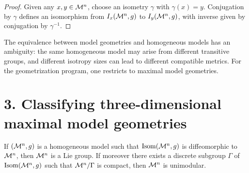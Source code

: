 \begin{proof}
Given any $x,y \in \mathcal{M}^n$, choose an isometry $\gamma$ with $\gamma(x)=y$. Conjugation by $\gamma$ defines an isomorphism from $I_x(\mathcal{M}^n,g)$ to $I_y(\mathcal{M}^n,g)$, with inverse given by conjugation by $\gamma^{-1}$.
\end{proof}

\begin{remark}
\label{ch01-rem-model-geometry-ambiguity}
The equivalence between model geometries and homogeneous models has an ambiguity: the same homogeneous model may arise from different transitive groups, and different isotropy sizes can lead to different compatible metrics. For the geometrization program, one restricts to maximal model geometries.
\end{remark}

\section*{3. Classifying three-dimensional maximal model geometries}

\begin{lemma}
\label{ch01-lem-unimodular-lie-group}
If $(\mathcal{M}^n,g)$ is a homogeneous model such that $\operatorname{Isom}(\mathcal{M}^n,g)$ is diffeomorphic to $\mathcal{M}^n$, then $\mathcal{M}^n$ is a Lie group. If moreover there exists a discrete subgroup $\Gamma$ of $\operatorname{Isom}(\mathcal{M}^n,g)$ such that $\mathcal{M}^n/\Gamma$ is compact, then $\mathcal{M}^n$ is unimodular.
\end{lemma}

